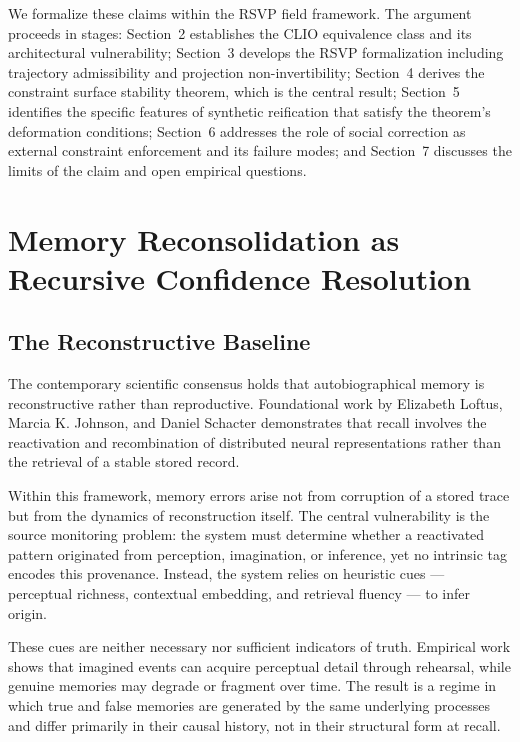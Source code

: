 \documentclass[12pt, a4paper]{article}
\begin{document}
We formalize these claims within the RSVP field framework. The argument proceeds in stages: Section~2 establishes the CLIO equivalence class and its architectural vulnerability; Section~3 develops the RSVP formalization including trajectory admissibility and projection non-invertibility; Section~4 derives the constraint surface stability theorem, which is the central result; Section~5 identifies the specific features of synthetic reification that satisfy the theorem's deformation conditions; Section~6 addresses the role of social correction as external constraint enforcement and its failure modes; and Section~7 discusses the limits of the claim and open empirical questions.

\section{Memory Reconsolidation as Recursive Confidence Resolution}

\subsection{The Reconstructive Baseline}

The contemporary scientific consensus holds that autobiographical memory is reconstructive rather than reproductive. Foundational work by Elizabeth Loftus, Marcia K. Johnson, and Daniel Schacter demonstrates that recall involves the reactivation and recombination of distributed neural representations rather than the retrieval of a stable stored record.

Within this framework, memory errors arise not from corruption of a stored trace but from the dynamics of reconstruction itself. The central vulnerability is the source monitoring problem: the system must determine whether a reactivated pattern originated from perception, imagination, or inference, yet no intrinsic tag encodes this provenance. Instead, the system relies on heuristic cues --- perceptual richness, contextual embedding, and retrieval fluency --- to infer origin.

These cues are neither necessary nor sufficient indicators of truth. Empirical work shows that imagined events can acquire perceptual detail through rehearsal, while genuine memories may degrade or fragment over time. The result is a regime in which true and false memories are generated by the same underlying processes and differ primarily in their causal history, not in their structural form at recall.
\end{document}
